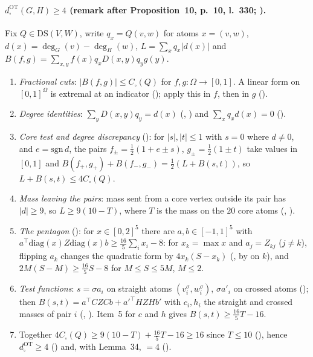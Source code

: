 \paragraph{$d^{\mathrm{OT}}_\square(G,H)\ge4$ (remark after Proposition~10, p.~10, l.~330; ).} Fix $Q\in\mathrm{DS}(V,W)$, write
$q_x=Q(v,w)$ for atoms $x=(v,w)$, $d(x)=\deg_G(v)-\deg_H(w)$, $L=\sum_xq_x|d(x)|$ and
$B(f,g)=\sum_{x,y}f(x)q_xD(x,y)q_yg(y)$.
\begin{enumerate}
\item \emph{Fractional cuts}: $|B(f,g)|\le C_\square(Q)$ for $f,g\colon\Omega\to[0,1]$. A linear form on
$[0,1]^\Omega$ is extremal at an indicator (); apply this in $f$, then in $g$
().
\item \emph{Degree identities}: $\sum_yD(x,y)q_y=d(x)$ (, ) and
$\sum_xq_xd(x)=0$ ().
\item \emph{Core test and degree discrepancy} (): for $|s|,|t|\le1$ with $s=0$ where $d\ne0$, and $e=\mathrm{sgn}\,d$, the
pairs $f_\pm=\frac12(1+e\pm s)$, $g_\pm=\frac12(1\pm t)$ take values in $[0,1]$ and
$B(f_+,g_+)+B(f_-,g_-)=\frac12(L+B(s,t))$, so $L+B(s,t)\le4C_\square(Q)$.
\item \emph{Mass leaving the pairs}: mass sent from a core vertex outside its pair has $|d|\ge9$, so
$L\ge9(10-T)$, where $T$ is the mass on the $20$ core atoms (, ).
\item \emph{The pentagon} (): for $x\in[0,2]^5$ there are $a,b\in[-1,1]^5$ with
$a^\top\mathrm{diag}(x)Z\mathrm{diag}(x)b\ge\frac{16}5\sum_ix_i-8$: for $x_k=\max x$ and $a_j=Z_{kj}$ ($j\ne k$), flipping
$a_k$ changes the quadratic form by $4x_k(S-x_k)$ (, by  on $k$), and
$2M(S-M)\ge\frac{16}5S-8$ for $M\le S\le5M$, $M\le2$.
\item \emph{Test functions}: $s=\sigma a_i$ on straight atoms $(v_i^\sigma,w_i^\sigma)$, $\sigma a'_i$ on
crossed atoms (); then $B(s,t)=a^\top CZCb+a'^\top HZHb'$ with $c_i,h_i$ the straight and crossed
masses of pair $i$ (, ). Item~5 for $c$ and $h$ gives $B(s,t)\ge\frac{16}5T-16$.
\item Together $4C_\square(Q)\ge9(10-T)+\frac{16}5T-16\ge16$ since $T\le10$ (), hence
$d^{\mathrm{OT}}_\square\ge4$ () and, with Lemma~34, $=4$ ().
\end{enumerate}

